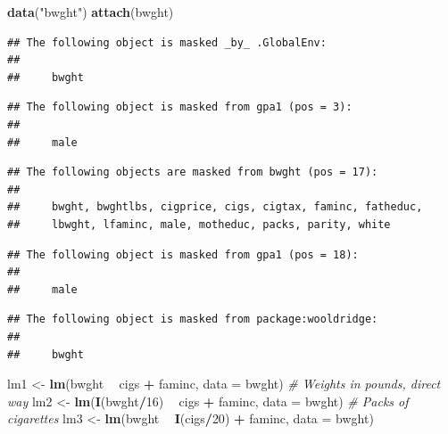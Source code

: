 \documentclass[]{book}
\newenvironment{Shaded}{\begin{snugshade}}{\end{snugshade}}
\newcommand{\CommentTok}[1]{\textcolor[rgb]{0.56,0.35,0.01}{\textit{#1}}}
\newcommand{\DataTypeTok}[1]{\textcolor[rgb]{0.13,0.29,0.53}{#1}}
\newcommand{\DecValTok}[1]{\textcolor[rgb]{0.00,0.00,0.81}{#1}}
\newcommand{\KeywordTok}[1]{\textcolor[rgb]{0.13,0.29,0.53}{\textbf{#1}}}
\newcommand{\NormalTok}[1]{#1}
\newcommand{\OperatorTok}[1]{\textcolor[rgb]{0.81,0.36,0.00}{\textbf{#1}}}
\newcommand{\StringTok}[1]{\textcolor[rgb]{0.31,0.60,0.02}{#1}}
\begin{document}
\begin{Shaded}
\begin{Highlighting}[]
\KeywordTok{data}\NormalTok{(}\StringTok{"bwght"}\NormalTok{)}
\KeywordTok{attach}\NormalTok{(bwght)}
\end{Highlighting}
\end{Shaded}

\begin{verbatim}
## The following object is masked _by_ .GlobalEnv:
## 
##     bwght
\end{verbatim}

\begin{verbatim}
## The following object is masked from gpa1 (pos = 3):
## 
##     male
\end{verbatim}

\begin{verbatim}
## The following objects are masked from bwght (pos = 17):
## 
##     bwght, bwghtlbs, cigprice, cigs, cigtax, faminc, fatheduc,
##     lbwght, lfaminc, male, motheduc, packs, parity, white
\end{verbatim}

\begin{verbatim}
## The following object is masked from gpa1 (pos = 18):
## 
##     male
\end{verbatim}

\begin{verbatim}
## The following object is masked from package:wooldridge:
## 
##     bwght
\end{verbatim}

\begin{Shaded}
\begin{Highlighting}[]
\NormalTok{lm1 <-}\StringTok{ }\KeywordTok{lm}\NormalTok{(bwght }\OperatorTok{~}\StringTok{ }\NormalTok{cigs }\OperatorTok{+}\StringTok{ }\NormalTok{faminc, }\DataTypeTok{data =}\NormalTok{ bwght)}
\CommentTok{# Weights in pounds, direct way}
\NormalTok{lm2 <-}\StringTok{ }\KeywordTok{lm}\NormalTok{(}\KeywordTok{I}\NormalTok{(bwght}\OperatorTok{/}\DecValTok{16}\NormalTok{) }\OperatorTok{~}\StringTok{ }\NormalTok{cigs }\OperatorTok{+}\StringTok{ }\NormalTok{faminc, }\DataTypeTok{data =}\NormalTok{ bwght)}
\CommentTok{# Packs of cigarettes}
\NormalTok{lm3 <-}\StringTok{ }\KeywordTok{lm}\NormalTok{(bwght }\OperatorTok{~}\StringTok{ }\KeywordTok{I}\NormalTok{(cigs}\OperatorTok{/}\DecValTok{20}\NormalTok{) }\OperatorTok{+}\StringTok{ }\NormalTok{faminc, }\DataTypeTok{data =}\NormalTok{ bwght)}
\end{Highlighting}
\end{Shaded}
\end{document}
